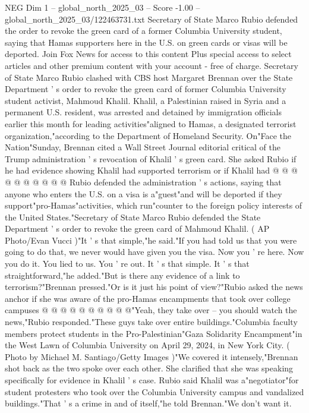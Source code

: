 \begin{textsample}{NEG Dim 1 – global\_north\_2025\_03 – Score -1.00 – global\_north\_2025\_03/122463731.txt}  \label{ex:f1_neg_050}
Secretary of State Marco Rubio defended the order to revoke the green card of a former Columbia University student, saying that Hamas supporters here in the U.S. on green cards or visas will be deported.
Join Fox News for access to this content Plus special access to select articles and other premium content with your account - free of charge.
Secretary of State Marco Rubio clashed with CBS host Margaret Brennan over the State Department ' s order to revoke the green card of former Columbia University student activist, Mahmoud Khalil.
Khalil, a Palestinian raised in Syria and a permanent U.S. resident, was arrested and detained by immigration officials earlier this month for leading activities"aligned to Hamas, a designated terrorist organization,"according to the Department of Homeland Security.
On"Face the Nation"Sunday, Brennan cited a Wall Street Journal editorial critical of the Trump administration ' s revocation of Khalil ' s green card.
She asked Rubio if he had evidence showing Khalil had supported terrorism or if Khalil had @ @ @ @ @ @ @ @ @ @ Rubio defended the administration ' s actions, saying that anyone who enters the U.S. on a visa is a"guest"and will be deported if they support"pro-Hamas"activities, which run"counter to the foreign policy interests of the United States."Secretary of State Marco Rubio defended the State Department ' s order to revoke the green card of Mahmoud Khalil. ( AP Photo/Evan Vucci )"It ' s that simple,"he said."If you had told us that you were going to do that, we never would have given you the visa.
Now you ' re here.
Now you do it.
You lied to us.
You ' re out.
It ' s that simple.
It ' s that straightforward,"he added."But is there any evidence of a link to terrorism?"Brennan pressed."Or is it just his point of view?"Rubio asked the news anchor if she was aware of the pro-Hamas encampments that took over college campuses @ @ @ @ @ @ @ @ @ @"Yeah, they take over -- you should watch the news,"Rubio responded."These guys take over entire buildings."Columbia faculty members protect students in the Pro-Palestinian"Gaza Solidarity Encampment"in the West Lawn of Columbia University on April 29, 2024, in New York City. ( Photo by Michael M.
Santiago/Getty Images )"We covered it intensely,"Brennan shot back as the two spoke over each other.
She clarified that she was speaking specifically for evidence in Khalil ' s case.
Rubio said Khalil was a"negotiator"for student protesters who took over the Columbia University campus and vandalized buildings."That ' s a crime in and of itself,"he told Brennan."We don't want it.

\end{textsample}
